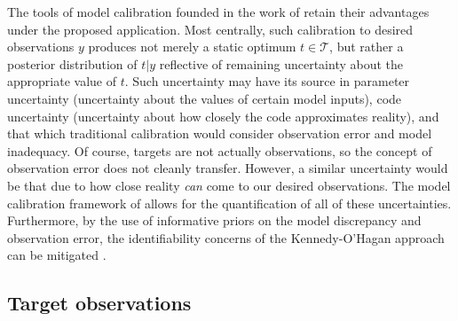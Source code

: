 \documentclass{article}
\begin{document}
The tools of model calibration founded in the work of \cite{Kennedy2001} retain their advantages under the proposed application.
%
Most centrally, such calibration to desired observations $y$ produces not merely a static optimum $t\in\mathcal T$, but rather a posterior distribution of $t|y$ reflective of remaining uncertainty about the appropriate value of $t$. 
%
Such uncertainty may have its source in parameter uncertainty (uncertainty about the values of certain model inputs), code uncertainty (uncertainty about how closely the code approximates reality), and that which traditional calibration would consider observation error and model inadequacy. 
%
Of course,  targets are not actually observations, so the concept of observation error does not cleanly transfer. 
%
However, a similar uncertainty would be that due to how close reality \emph{can} come to our desired observations. 
The model calibration framework of \cite{Kennedy2001} allows for the quantification of all of these uncertainties. Furthermore, by the use of informative priors on the model discrepancy and observation error, the identifiability concerns of the Kennedy-O'Hagan approach can be mitigated \citep{Bayarri2007,Tuo2016}.

\subsection{Target observations}
\end{document}
